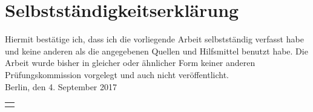 \section*{Selbstständigkeitserklärung}

Hiermit bestätige ich, dass ich die vorliegende Arbeit selbstständig verfasst habe und keine anderen als die angegebenen Quellen und Hilfsmittel benutzt habe. Die Arbeit wurde bisher in gleicher oder ähnlicher Form keiner anderen Prüfungskommission vorgelegt und auch nicht veröffentlicht.
\\[5ex]
Berlin, den 4. September 2017 %

 \renewcommand{\arraystretch}{1.5}

\hspace*{\fill}\begin{tabular}{@{}l@{}}\hline
	\makebox[5cm]{Susanne R\"ohl}
\end{tabular}



